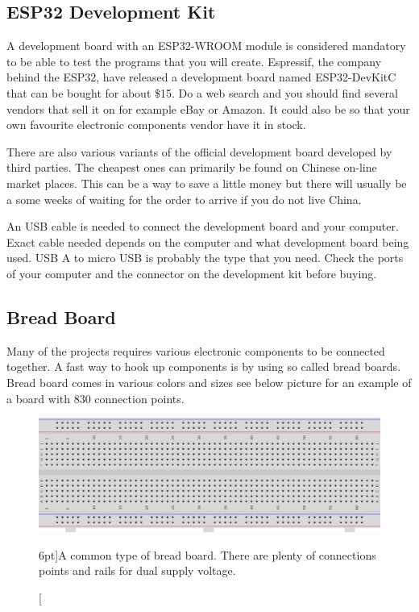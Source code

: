 \documentclass{tufte-book}
\begin{document}
\subsection{ESP32 Development Kit}
A development board with an ESP32-WROOM module is considered mandatory to be 
able to test the programs that you will create. Espressif, the company behind 
the ESP32, have released a development board named ESP32-DevKitC that can be 
bought for about \$15. Do a web search and you should find several vendors that 
sell it on for example eBay or Amazon. It could also be so that your own 
favourite electronic components vendor have it in stock.

There are also various variants of the official development board developed by 
third parties. The cheapest ones can primarily be found on Chinese on-line 
market places. This can be a way to save a little money but there will usually 
be a some weeks of waiting for the order to arrive if you do not live China.

An USB cable is needed to connect the development board and your computer. 
Exact cable needed depends on the computer and what development board being 
used. USB A to micro USB is probably the type that you need. Check the ports of 
your computer and the connector on the development kit before buying.

\subsection{Bread Board}
Many of the projects requires various electronic components to be connected 
together. A fast way to hook up components is by using so called bread boards. 
Bread board comes in various colors and sizes see below picture for an example 
of a board with 830 connection points.

\begin{figure}
	\includegraphics{bread_board.png}
	\caption[Bread board $n$.][6pt]{A common type of bread board. There are plenty of connections points and rails for dual supply voltage.}
	\label{fig:bread_board}
\end{figure}
\end{document}
